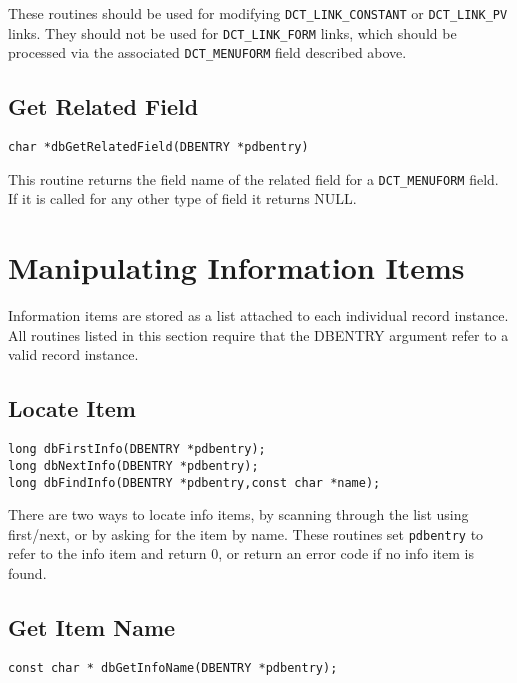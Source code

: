 These routines should be used for modifying \verb|DCT_LINK_CONSTANT| or \verb|DCT_LINK_PV| links. They should not be used 
for \verb|DCT_LINK_FORM| links, which should be processed via the associated \verb|DCT_MENUFORM| field described above.

\subsection{Get Related Field}

\begin{verbatim}
char *dbGetRelatedField(DBENTRY *pdbentry)
\end{verbatim}

This routine returns the field name of the related field for a \verb|DCT_MENUFORM| field.
If it is called for any other type of field it returns NULL.

\section{Manipulating Information Items}

Information items are stored as a list attached to each individual record instance. All routines listed in this section require 
that the DBENTRY argument refer to a valid record instance.

\subsection{Locate Item}

\begin{verbatim}
long dbFirstInfo(DBENTRY *pdbentry);
long dbNextInfo(DBENTRY *pdbentry);
long dbFindInfo(DBENTRY *pdbentry,const char *name);
\end{verbatim}

There are two ways to locate info items, by scanning through the list using first/next, or by asking for the item by name.
These routines set \verb|pdbentry| to refer to the info item and return 0, or return an error code if no info item is found.

\subsection{Get Item Name}

\begin{verbatim}
const char * dbGetInfoName(DBENTRY *pdbentry);
\end{verbatim}

